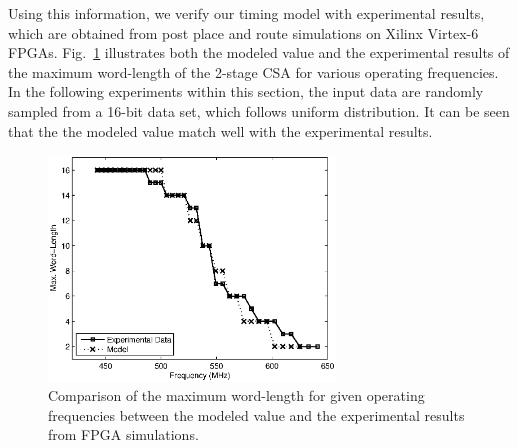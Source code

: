 \documentclass[journal]{IEEEtran}
\begin{document}
Using this information, we verify our timing model with experimental results, which are obtained from post place and route simulations on Xilinx Virtex-6 FPGAs. Fig.~\ref{CSA Model Verification} illustrates both the modeled value and the experimental results of the maximum word-length of the 2-stage CSA for various operating frequencies. In the following experiments within this section, the input data are randomly sampled from a 16-bit data set, which follows uniform distribution. It can be seen that the the modeled value match well with the experimental results.
\begin{figure}[htbp]
  \centering
  \includegraphics[width=3in]{./Figures/Model.eps}
  \caption{Comparison of the maximum word-length for given operating frequencies between the modeled value and the experimental results from FPGA simulations.}
  \label{CSA Model Verification}
\end{figure}

\end{document}
